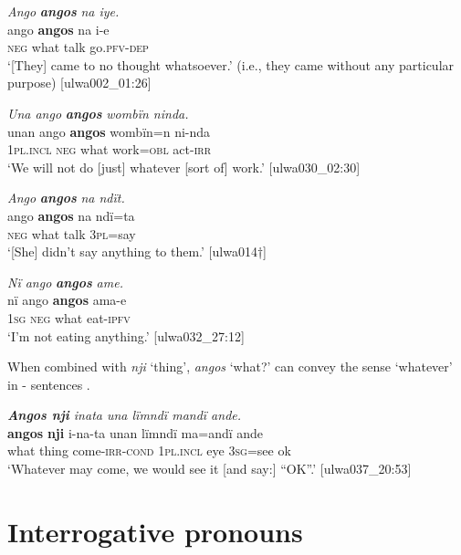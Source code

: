 \ea%
    \label{ex:pron:46}
          \textit{Ango} \textbf{\textit{angos}} \textit{na iye.}\\
\gll ango  \textbf{angos}    na    i-e\\
    \textsc{neg}  what    talk  go.\textsc{pfv-dep}\\
\glt    ‘[They] came to no thought whatsoever.’ (i.e., they came without any particular purpose) [ulwa002\_01:26]
\z

\ea%
    \label{ex:pron:47}
          \textit{Una ango} \textbf{\textit{angos}} \textit{wombïn ninda.}\\
\gll unan    ango  \textbf{angos}  wombïn=n  ni-nda\\
    1\textsc{pl.incl}  \textsc{neg}  what  work=\textsc{obl}  act-\textsc{irr}\\
\glt `We will not do [just] whatever [sort of] work.’ [ulwa030\_02:30]
\z

\ea%
    \label{ex:pron:48}
          \textit{Ango} \textbf{\textit{angos}} \textit{na ndït.}\\
\gll    ango  \textbf{angos}  na    ndï=ta\\
    \textsc{neg}  what  talk  3\textsc{pl}=say\\
\glt `[She] didn’t say anything to them.’ [ulwa014†]
\z

\ea%
    \label{ex:pron:49}
          \textit{Nï ango} \textbf{\textit{angos}} \textit{ame.}\\
\gll nï    ango  \textbf{angos}  ama-e\\
    1\textsc{sg}  \textsc{neg}  what  eat-\textsc{ipfv}\\
\glt `I’m not eating anything.’ [ulwa032\_27:12]
\z

When combined with \textit{nji} ‘thing’, \textit{angos} ‘what?’ can convey the sense ‘whatever’ in - sentences .


\ea%
    \label{ex:pron:50}
          \textit{\textbf{Angos nji} inata una lïmndï mandï ande.}\\
\gll \textbf{angos}  \textbf{nji}    i-na-ta        unan    lïmndï  ma=andï  ande\\
    what  thing  come-\textsc{irr-cond}  \textsc{1pl.incl}  eye    3\textsc{sg}=see  ok\\
\glt `Whatever may come, we would see it [and say:] “OK”.’ [ulwa037\_20:53]
\z

\section{Interrogative pronouns}\label{sec:6.5}

